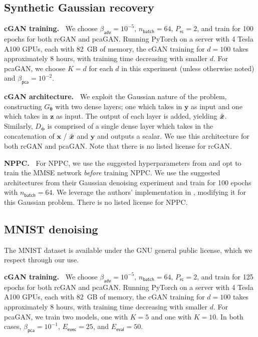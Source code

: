 \documentclass{article}
\theoremstyle{plain}
\theoremstyle{definition}
\theoremstyle{remark}
\newcommand{\hvec}[1]{\ensuremath{\Hat{\boldsymbol{#1}}}}
\renewcommand{\vec}[1]{\ensuremath{\boldsymbol{#1}}}
\newcommand{\batch}{_{\mathsf{batch}}}
\newcommand{\train}{_{\mathsf{rc}}}
\newcommand{\eval}{_{\mathsf{eval}}}
\newcommand{\evec}{_{\mathsf{evec}}}
\newcommand{\betaadv}{\beta_{\mathsf{adv}}}
\newcommand{\betapca}{\beta_{\mathsf{pca}}}
\begin{document}
\subsection{Synthetic Gaussian recovery}\label{app:implementation_gaussian}
\textbf{cGAN training.~}
We choose $\betaadv=10^{-5}$, $n\batch=64$, $P\train=2$, and train for 100 epochs for both rcGAN and pcaGAN.
Running PyTorch on a server with 4 Tesla A100 GPUs, each with 82~GB of memory, the cGAN training for $d=100$ takes approximately 8 hours, with training time decreasing with smaller $d$.
For pcaGAN, we choose $K=d$ for each $d$ in this experiment (unless otherwise noted) and $\betapca=10^{-2}$.

\textbf{cGAN architecture.~}
We exploit the Gaussian nature of the problem, constructing $G_{\vec{\theta}}$ with two dense layers; one which takes in $\vec{y}$ as input and one which takes in $\vec{z}$ as input.
The output of each layer is added, yielding $\hvec{x}$.
Similarly, $D_{\vec{\phi}}$ is comprised of a single dense layer which takes in the concatenation of $\vec{x}$ / $\hvec{x}$ and $\vec{y}$ and outputs a scalar.
We use this architecture for both rcGAN and pcaGAN.
Note that there is no listed license for rcGAN.

\textbf{NPPC.~}
For NPPC, we use the suggested hyperparameters from \cite{Nehme:NIPS:23} and opt to train the MMSE network \emph{before} training NPPC.
We use the suggested architectures from their Gaussian denoising experiment and train for 100 epochs with $n\batch=64$.
We leverage the authors' implementation in \cite{Nehme:github:23}, modifying it for this Gaussian problem.
There is no listed license for NPPC.

\subsection{MNIST denoising}
The MNIST dataset is available under the GNU general public license, which we respect through our use.

\textbf{cGAN training.~}
We choose $\betaadv=10^{-5}$, $n\batch=64$, $P\train=2$, and train for 125 epochs for both rcGAN and pcaGAN.
Running PyTorch on a server with 4 Tesla A100 GPUs, each with 82~GB of memory, the cGAN training for $d=100$ takes approximately 8 hours, with training time decreasing with smaller $d$.
For pcaGAN, we train two models, one with $K=5$ and one with $K=10$.
In both cases, $\betapca=10^{-1}$, $E\evec=25$, and $E\eval=50$.
\end{document}
